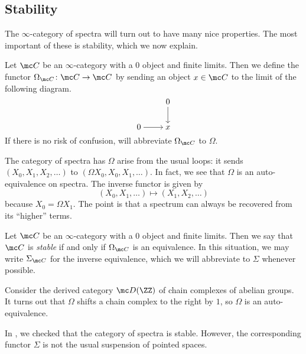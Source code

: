 \documentclass[../notes.tex]{subfiles}
\begin{document}
\subsection{Stability}
The $\infty$-category of spectra will turn out to have many nice properties. The most important of these is stability, which we now explain.
\begin{notation}
	Let $\mc C$ be an $\infty$-category with a $0$ object and finite limits. Then we define the functor $\Omega_{\mc C}\colon\mc C\to\mc C$ by sending an object $x\in\mc C$ to the limit of the following diagram.
	\[\begin{tikzcd}[cramped]
		& 0 \\
		0 & x
		\arrow[from=1-2, to=2-2]
		\arrow[from=2-1, to=2-2]
	\end{tikzcd}\]
	If there is no risk of confusion, will abbreviate $\Omega_{\mc C}$ to $\Omega$.
\end{notation}
\begin{example} \label{ex:spectra-is-stable}
	The category of spectra has $\Omega$ arise from the usual loops: it sends $(X_0,X_1,X_2,\ldots)$ to $(\Omega X_0,X_0,X_1,\ldots)$. In fact, we see that $\Omega$ is an auto-equivalence on spectra. The inverse functor is given by
	\[(X_0,X_1,\ldots)\mapsto(X_1,X_2,\ldots)\]
	because $X_0=\Omega X_1$. The point is that a spectrum can always be recovered from its ``higher'' terms.
\end{example}
\begin{definition}[stable]
	Let $\mc C$ be an $\infty$-category with a $0$ object and finite limits. Then we say that $\mc C$ is \textit{stable} if and only if $\Omega_{\mc C}$ is an equivalence. In this situation, we may write $\Sigma_{\mc C}$ for the inverse equivalence, which we will abbreviate to $\Sigma$ whenever possible.
\end{definition}
\begin{example}
	Consider the derived category $\mc D(\ZZ)$ of chain complexes of abelian groups. It turns out that $\Omega$ shifts a chain complex to the right by $1$, so $\Omega$ is an auto-equivalence.
\end{example}
\begin{remark}
	In , we checked that the category of spectra is stable. However, the corresponding functor $\Sigma$ is not the usual suspension of pointed spaces.
\end{remark}
\end{document}

